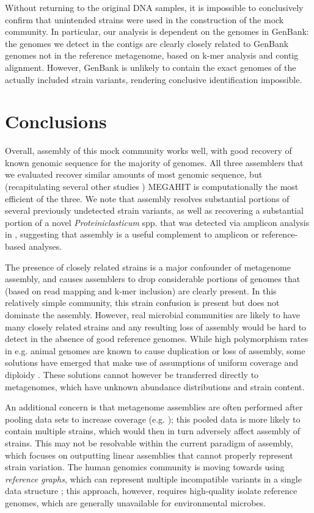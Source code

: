 \documentclass[11pt]{article}
\begin{document}
Without returning to the original DNA samples, it is impossible to
conclusively confirm that unintended strains were used in the
construction of the mock community.  In particular, our analysis is
dependent on the genomes in GenBank: the genomes we detect in the
contigs are clearly closely related to GenBank genomes not in
the reference metagenome, based on k-mer analysis and
contig alignment.  However, GenBank is unlikely to contain the exact
genomes of the actually included strain variants, rendering conclusive
identification impossible.

\section*{Conclusions}


Overall, assembly of this mock community works well, with good
recovery of known genomic sequence for the majority of genomes.  All
three assemblers that we evaluated recover similar amounts of most
genomic sequence, but (recapitulating several other studies \cite{CAMI,Vollmers2017,metag_one})
MEGAHIT is computationally the most efficient of the three.
We note that assembly
resolves substantial portions of several previously undetected strain
variants, as well as recovering a substantial portion of a novel
{\em Proteiniclasticum} spp. that was detected via amplicon analysis
in \cite{podar}, suggesting that assembly is a useful complement to amplicon
or reference-based analyses.

The presence of closely related strains is a major confounder of
metagenome assembly, and causes assemblers to drop considerable
portions of genomes that (based on read mapping and k-mer inclusion)
are clearly present.  In this relatively simple community, this strain
confusion is present but does not dominate the assembly.  However,
real microbial communities are likely to have many closely related
strains and any resulting loss of assembly would be hard to detect in
the absence of good reference genomes.  While high polymorphism rates
in e.g. animal genomes are known to cause duplication or loss of
assembly, some solutions have emerged that make use of assumptions of
uniform coverage and diploidy \cite{Kim2007}.  These solutions cannot
however be transferred directly to metagenomes, which have unknown
abundance distributions and strain content.

An additional concern is that metagenome assemblies are often
performed after pooling data sets to increase coverage
(e.g. \cite{Sharon2012,Hu2016}); this pooled data is more likely to
contain multiple strains, which would then in turn adversely affect
assembly of strains.  This may not be resolvable within the current
paradigm of assembly, which focuses on outputting linear assemblies
that cannot properly represent strain variation.  The human genomics
community is moving towards using {\em reference graphs}, which can
represent multiple incompatible variants in a single data structure
\cite{paten2017genome}; this approach, however, requires high-quality
isolate reference genomes, which are generally unavailable for
environmental microbes.
\end{document}
